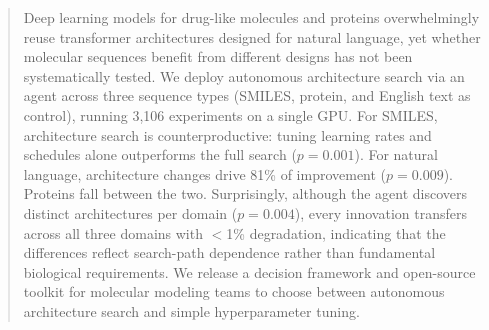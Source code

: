 \begin{abstract}
Deep learning models for drug-like molecules and proteins overwhelmingly reuse transformer architectures designed for natural language, yet whether molecular sequences benefit from different designs has not been systematically tested. We deploy autonomous architecture search via an agent across three sequence types (SMILES, protein, and English text as control), running 3{,}106 experiments on a single GPU. For SMILES, architecture search is counterproductive: tuning learning rates and schedules alone outperforms the full search ($p = 0.001$). For natural language, architecture changes drive 81\% of improvement ($p = 0.009$). Proteins fall between the two. Surprisingly, although the agent discovers distinct architectures per domain ($p = 0.004$), every innovation transfers across all three domains with $<$1\% degradation, indicating that the differences reflect search-path dependence rather than fundamental biological requirements. We release a decision framework and open-source toolkit for molecular modeling teams to choose between autonomous architecture search and simple hyperparameter tuning.
\end{abstract}
